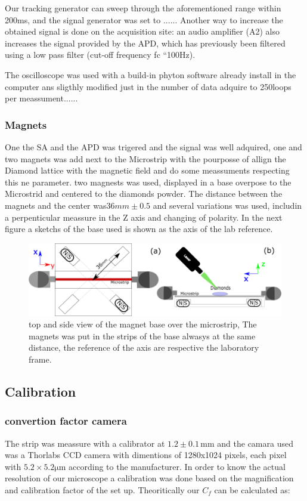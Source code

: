 Our tracking generator can sweep through the aforementioned range within 200ms, and  the signal generator was set to ......  Another way to increase the obtained signal is done on the acquisition site: an audio ampliﬁer (A2) also increases the signal provided by the APD, which has previously been ﬁltered using a low pass ﬁlter (cut-oﬀ frequency fc “100Hz). 
 
 The oscilloscope was used with a build-in phyton software already install in the computer ans sligthly modified just in the number of data adquire to 250loops per meassument......
 
 \subsubsection{Magnets}
 One the SA and the APD was trigered and the signal was well adquired, one and two magnets was add next to the Microstrip with the pourposse of allign the Diamond lattice with the magnetic field  and do some meassuments respecting this ne parameter.
two magnests was used, displayed in a base overpose to the Microstrid and centered to the diamonds powder. The distance between the magnets and the center was$36mm \pm 0.5$ and several variations was used, includin a perpenticular meassure in the Z axis and changing of  polarity.  In the next figure a sketchs of the base used is shown as the axis of the lab reference.
\begin{figure}
	\centering
	\includegraphics[width=0.7\linewidth]{../figures/magnets}
	\caption[mag]{top and side view of the magnet base over the microstrip, The magnets was put in the strips of the base alwasys at the same distance, the reference of the axis are respective the laboratory frame.}
	\label{fig:magnets}
\end{figure}


\subsection{Calibration}
\subsubsection{convertion factor camera}
The strip was meassure with a calibrator at $1.2\pm 0.1\,\mathrm{mm}$ and the camara used was a Thorlabs CCD camera with dimentions of 1280x1024 pixels, each pixel with $5.2\times5.2 \mathrm{\mu m}$ according to the manufacturer.
In order to know the actual resolution of our microscope a calibration was done based on the magnification and calibration factor of the set up.
Theoritically our $C_{f}$ can be calculated as:
\\

